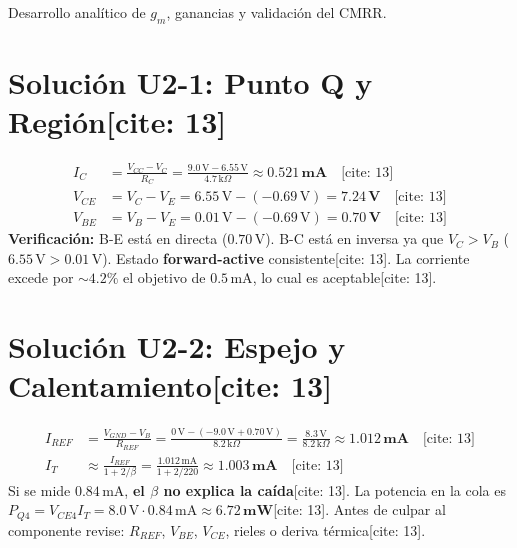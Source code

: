 \documentclass[11pt, a4paper]{article}
\begin{document}
\begin{tcolorbox}[colback=red!5, colframe=red!70!black, title=\textbf{Solucionario Detallado: PARTE II — Unidad 2 (Par Diferencial)[cite: 13]}]
    Desarrollo analítico de $g_m$, ganancias y validación del CMRR.
\end{tcolorbox}

\section*{Solución U2-1: Punto Q y Región[cite: 13]}
\begin{align*}
    I_C &= \frac{V_{CC} - V_C}{R_C} = \frac{9.0\,\text{V} - 6.55\,\text{V}}{4.7\,\text{k}\Omega} \approx \mathbf{0.521\,\text{mA}} \quad \text{[cite: 13]} \\
    V_{CE} &= V_C - V_E = 6.55\,\text{V} - (-0.69\,\text{V}) = \mathbf{7.24\,\text{V}} \quad \text{[cite: 13]} \\
    V_{BE} &= V_B - V_E = 0.01\,\text{V} - (-0.69\,\text{V}) = \mathbf{0.70\,\text{V}} \quad \text{[cite: 13]}
\end{align*}
\textbf{Verificación:} B-E está en directa ($0.70\,\text{V}$). B-C está en inversa ya que $V_C > V_B$ ($6.55\,\text{V} > 0.01\,\text{V}$). Estado \textbf{forward-active} consistente[cite: 13]. La corriente excede por $\sim 4.2\%$ el objetivo de $0.5\,\text{mA}$, lo cual es aceptable[cite: 13].

\section*{Solución U2-2: Espejo y Calentamiento[cite: 13]}
\begin{align*}
    I_{REF} &= \frac{V_{GND} - V_B}{R_{REF}} = \frac{0\,\text{V} - (-9.0\,\text{V} + 0.70\,\text{V})}{8.2\,\text{k}\Omega} = \frac{8.3\,\text{V}}{8.2\,\text{k}\Omega} \approx \mathbf{1.012\,\text{mA}} \quad \text{[cite: 13]} \\
    I_T &\approx \frac{I_{REF}}{1 + 2/\beta} = \frac{1.012\,\text{mA}}{1 + 2/220} \approx \mathbf{1.003\,\text{mA}} \quad \text{[cite: 13]}
\end{align*}
Si se mide $0.84\,\text{mA}$, \textbf{el $\beta$ no explica la caída}[cite: 13]. La potencia en la cola es $P_{Q4} = V_{CE4} I_T = 8.0\,\text{V} \cdot 0.84\,\text{mA} \approx \mathbf{6.72\,\text{mW}}$[cite: 13]. Antes de culpar al componente revise: $R_{REF}$, $V_{BE}$, $V_{CE}$, rieles o deriva térmica[cite: 13].
\end{document}
